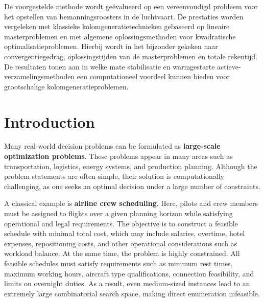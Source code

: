 \documentclass{book}
\theoremstyle{definition}
\numberwithin{algorithm_}{chapter}
\begin{document}
De voorgestelde methode wordt geëvalueerd op een vereenvoudigd probleem voor het opstellen van bemanningsroosters in de luchtvaart. De prestaties worden vergeleken met klassieke kolomgeneratietechnieken gebaseerd op lineaire masterproblemen en met algemene oplossingsmethoden voor kwadratische optimalisatieproblemen. Hierbij wordt in het bijzonder gekeken naar convergentiegedrag, oplossingstijden van de masterproblemen en totale rekentijd. De resultaten tonen aan in welke mate stabilisatie en warmgestarte actieve-verzamelingsmethoden een computationeel voordeel kunnen bieden voor grootschalige kolomgeneratieproblemen.





















\newpage

\section*{Introduction}
\thispagestyle{plain}
\markboth{}{}

Many real-world decision problems can be formulated as \textbf{large-scale optimization problems}. 
These problems appear in many areas such as transportation, logistics, energy systems, and production planning. 
Although the problem statements are often simple, their solution is computationally challenging, as one seeks an optimal decision under a large number of constraints.

A classical example is \textbf{airline crew scheduling}. 
Here, pilots and crew members must be assigned to flights over a given planning horizon while satisfying operational and legal requirements. 
The objective is to construct a feasible schedule with minimal total cost, which may include salaries, overtime, hotel expenses, repositioning costs, and other operational considerations such as workload balance.
At the same time, the problem is highly constrained. 
All feasible schedules must satisfy requirements such as minimum rest times, maximum working hours, aircraft type qualifications, connection feasibility, and limits on overnight duties. 
As a result, even medium-sized instances lead to an extremely large combinatorial search space, making direct enumeration infeasible.
\end{document}
